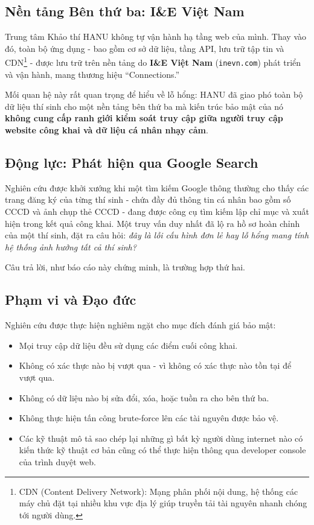 \documentclass[12pt,a4paper]{article}
\begin{document}
\subsection{Nền tảng Bên thứ ba: I\&E Việt Nam}

Trung tâm Khảo thí HANU không tự vận hành hạ tầng web của mình. Thay vào đó, toàn bộ ứng dụng - bao gồm cơ sở dữ liệu, tầng API, lưu trữ tập tin và CDN\footnote{CDN (Content Delivery Network): Mạng phân phối nội dung, hệ thống các máy chủ đặt tại nhiều khu vực địa lý giúp truyền tải tài nguyên nhanh chóng tới người dùng.} - được lưu trữ trên nền tảng do \textbf{I\&E Việt Nam} (\texttt{inevn.com}) phát triển và vận hành, mang thương hiệu ``Connections.''

Mối quan hệ này rất quan trọng để hiểu về lỗ hổng: HANU đã giao phó toàn bộ dữ liệu thí sinh cho một nền tảng bên thứ ba mà kiến trúc bảo mật của nó \textbf{không cung cấp ranh giới kiểm soát truy cập giữa người truy cập website công khai và dữ liệu cá nhân nhạy cảm}.

\subsection{Động lực: Phát hiện qua Google Search}

Nghiên cứu được khởi xướng khi một tìm kiếm Google thông thường cho thấy các trang đăng ký của từng thí sinh - chứa đầy đủ thông tin cá nhân bao gồm số CCCD và ảnh chụp thẻ CCCD - đang được công cụ tìm kiếm lập chỉ mục và xuất hiện trong kết quả công khai. Một truy vấn duy nhất đã lộ ra hồ sơ hoàn chỉnh của một thí sinh, đặt ra câu hỏi: \textit{đây là lỗi cấu hình đơn lẻ hay lỗ hổng mang tính hệ thống ảnh hưởng tất cả thí sinh?}

Câu trả lời, như báo cáo này chứng minh, là trường hợp thứ hai.

\subsection{Phạm vi và Đạo đức}

Nghiên cứu được thực hiện nghiêm ngặt cho mục đích đánh giá bảo mật:
\begin{itemize}[noitemsep]
    \item Mọi truy cập dữ liệu đều sử dụng các điểm cuối công khai.
    \item Không có xác thực nào bị vượt qua - vì không có xác thực nào tồn tại để vượt qua.
    \item Không có dữ liệu nào bị sửa đổi, xóa, hoặc tuồn ra cho bên thứ ba.
    \item Không thực hiện tấn công brute-force lên các tài nguyên được bảo vệ.
    \item Các kỹ thuật mô tả sao chép lại những gì bất kỳ người dùng internet nào có kiến thức kỹ thuật cơ bản cũng có thể thực hiện thông qua developer console của trình duyệt web.
\end{itemize}
\end{document}
